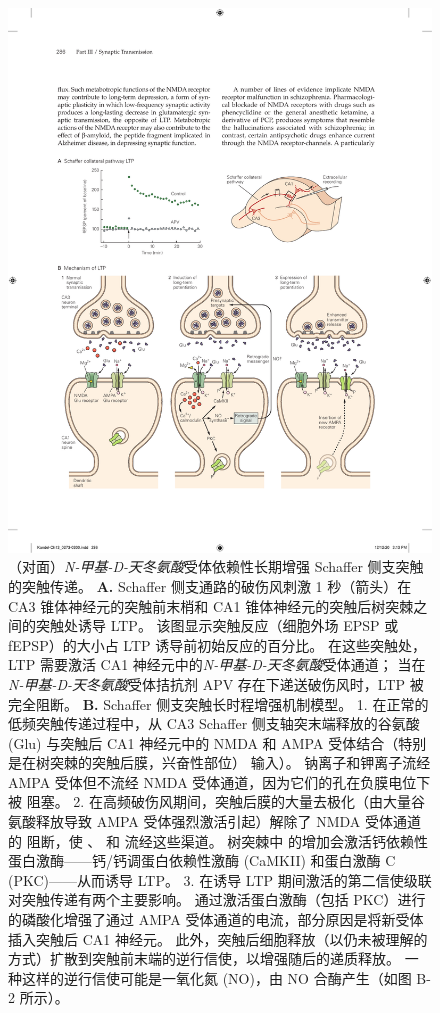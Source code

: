 \begin{figure}[htbp]
	\centering
	\includegraphics[width=0.85\linewidth]{chap13/fig_13_10}
	\caption{（对面）\textit{N-甲基-D-天冬氨酸}受体依赖性长期增强 Schaffer 侧支突触的突触传递。
		\textbf{A.} Schaffer 侧支通路的破伤风刺激 1 秒（箭头）在 CA3 锥体神经元的突触前末梢和 CA1 锥体神经元的突触后树突棘之间的突触处诱导 LTP。
		该图显示突触反应（细胞外场 EPSP 或 fEPSP）的大小占 LTP 诱导前初始反应的百分比。
		在这些突触处，LTP 需要激活 CA1 神经元中的\textit{N-甲基-D-天冬氨酸}受体通道； 
		当在\textit{N-甲基-D-天冬氨酸}受体拮抗剂 APV 存在下递送破伤风时，LTP 被完全阻断\cite{morgan2001electrical}。
		\textbf{B.} Schaffer 侧支突触长时程增强机制模型。
		1. 在正常的低频突触传递过程中，从 CA3 Schaffer 侧支轴突末端释放的谷氨酸 (Glu) 与突触后 CA1 神经元中的 NMDA 和 AMPA 受体结合（特别是在树突棘的突触后膜，兴奋性部位） 输入）。
		钠离子和钾离子流经 AMPA 受体但不流经 NMDA 受体通道，因为它们的孔在负膜电位下被  阻塞。
		2. 在高频破伤风期间，突触后膜的大量去极化（由大量谷氨酸释放导致 AMPA 受体强烈激活引起）解除了 NMDA 受体通道的  阻断，使 、 和  流经这些渠道。
		树突棘中  的增加会激活钙依赖性蛋白激酶——钙/钙调蛋白依赖性激酶 (CaMKII) 和蛋白激酶 C (PKC)——从而诱导 LTP。
		3. 在诱导 LTP 期间激活的第二信使级联对突触传递有两个主要影响。
		通过激活蛋白激酶（包括 PKC）进行的磷酸化增强了通过 AMPA 受体通道的电流，部分原因是将新受体插入突触后 CA1 神经元。
		此外，突触后细胞释放（以仍未被理解的方式）扩散到突触前末端的逆行信使，以增强随后的递质释放。
		一种这样的逆行信使可能是一氧化氮 (NO)，由 NO 合酶产生（如图 B-2 所示）。}
	\label{fig:13_10}
\end{figure}


